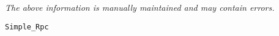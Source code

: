 \label{pkg:simple\_rpc}

{\tiny \it The above information is manually maintained and may contain errors.}
\begin{verbatim}
Simple_Rpc
\end{verbatim}
